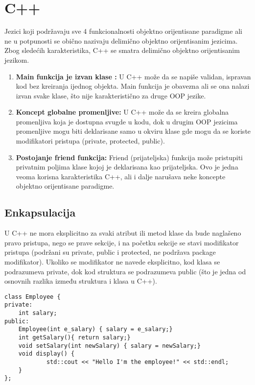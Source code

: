 \documentclass[a4paper]{article}
\begin{document}
\newpage

\section{C++}
\label{sec:c++}
Jezici koji podržavaju sve 4 funkcionalnosti objektno orijentisane paradigme ali ne u potpunosti se obično nazivaju delimično objektno orijentisanim jezicima. Zbog sledećih karakteristika, C++ se smatra delimično objektno orijentisanim jezikom.
\begin{enumerate}
\item \textbf{Main funkcija je izvan klase :} U C++ može da se napiše validan, ispravan kod bez kreiranja ijednog objekta. Main funkcija je obavezna ali se ona nalazi izvan svake klase, što nije karakteristično za druge OOP jezike.
\item \textbf{Koncept globalne promenljive:} U C++ može da se kreira globalna promenljiva koja je dostupna svugde u kodu, dok u drugim OOP jezicima promenljive mogu biti deklarisane samo u okviru klase gde mogu da se koriste modifikatori pristupa (private, protected, public).
\item \textbf{Postojanje friend funkcija:} Friend (prijateljska) funkcija može pristupiti privatnim poljima klase kojoj je deklarisana kao prijateljska. Ovo je jedna veoma korisna karakteristika C++, ali i dalje narušava neke koncepte objektno orijentisane paradigme.
\end{enumerate}

\subsection{Enkapsulacija}
\label{subsec:c++Enkapsulacija}
U C++ ne mora eksplicitno za svaki atribut ili metod klase da bude naglašeno pravo pristupa, nego se prave sekcije, i na početku sekcije se stavi modifikator pristupa (podržani su private, public i protected, ne podržava package modifikator). Ukoliko se modifikator ne navede eksplicitno, kod klasa se podrazumeva private, dok kod struktura se podrazumeva public (što je jedna od osnovnih razlika između struktura i klasa u C++).
\begin{lstlisting}[caption={Primer deklarisanja klase sa enkapsulacijom},frame=single, label=lst:c++Deklaracija]
class Employee {
private:
	int salary;
public: 
	Employee(int e_salary) { salary = e_salary;}
	int getSalary(){ return salary;}
	void setSalary(int newSalary) { salary = newSalary;}
	void display() {
     		std::cout << "Hello I'm the employee!" << std::endl;
	}
};
\end{lstlisting}
\end{document}

